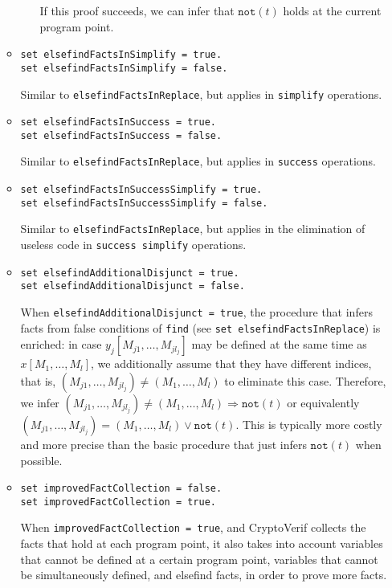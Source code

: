 \begin{itemize}
\begin{itemize}
\begin{itemize}
If this proof succeeds, we can infer that $\texttt{not}(t)$ holds
at the current program point.
\end{itemize}

\item \texttt{set elsefindFactsInSimplify = true.}\\
\texttt{set elsefindFactsInSimplify = false.}

Similar to \texttt{elsefindFactsInReplace}, but applies in
\texttt{simplify} operations. 

\item \texttt{set elsefindFactsInSuccess = true.}\\
\texttt{set elsefindFactsInSuccess = false.}

Similar to \texttt{elsefindFactsInReplace}, but applies in
\texttt{success} operations. 

\item \texttt{set elsefindFactsInSuccessSimplify = true.}\\
\texttt{set elsefindFactsInSuccessSimplify = false.}

Similar to \texttt{elsefindFactsInReplace}, but applies in
the elimination of useless code in \texttt{success simplify} operations. 


\item \texttt{set elsefindAdditionalDisjunct = true.}\\
\texttt{set elsefindAdditionalDisjunct = false.}

When \texttt{elsefindAdditionalDisjunct = true}, the procedure that infers facts
from false conditions of \texttt{find} (see \texttt{set elsefindFactsInReplace})
is enriched: in case $y_j[M_{j1}, \ldots, M_{jl_j}]$ may be defined
at the same time as $x[M_1, \ldots, M_l]$, we additionally assume
that they have different indices, that is, $(M_{j1}, \ldots, M_{jl_j}) \neq (M_1, \ldots, M_l)$
to eliminate this case. Therefore, we infer 
$(M_{j1}, \ldots, M_{jl_j}) \neq (M_1, \ldots, M_l) \Rightarrow \texttt{not}(t)$
or equivalently $(M_{j1}, \ldots, M_{jl_j}) = (M_1, \ldots, M_l) \vee \texttt{not}(t)$.
This is typically more costly and more precise than the basic 
procedure that just infers $\texttt{not}(t)$ when possible.

\item \texttt{set improvedFactCollection = false.}\\
\texttt{set improvedFactCollection = true.}

When \texttt{improvedFactCollection = true}, and CryptoVerif collects
the facts that hold at each program point, it also takes into account
variables that cannot be defined at a certain program point, variables
that cannot be simultaneously defined, and elsefind facts, in order to
prove more facts.


\end{itemize}
\end{itemize}
